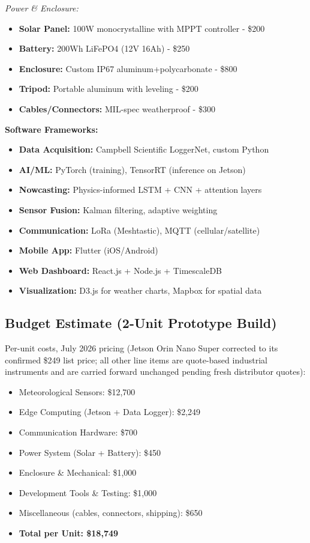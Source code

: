 \textit{Power \& Enclosure:}
\begin{itemize}
    \item \textbf{Solar Panel:} 100W monocrystalline with MPPT controller - \$200
    \item \textbf{Battery:} 200Wh LiFePO4 (12V 16Ah) - \$250
    \item \textbf{Enclosure:} Custom IP67 aluminum+polycarbonate - \$800
    \item \textbf{Tripod:} Portable aluminum with leveling - \$200
    \item \textbf{Cables/Connectors:} MIL-spec weatherproof - \$300
\end{itemize}

\textbf{Software Frameworks:}
\begin{itemize}
    \item \textbf{Data Acquisition:} Campbell Scientific LoggerNet, custom Python
    \item \textbf{AI/ML:} PyTorch (training), TensorRT (inference on Jetson)
    \item \textbf{Nowcasting:} Physics-informed LSTM + CNN + attention layers
    \item \textbf{Sensor Fusion:} Kalman filtering, adaptive weighting
    \item \textbf{Communication:} LoRa (Meshtastic), MQTT (cellular/satellite)
    \item \textbf{Mobile App:} Flutter (iOS/Android)
    \item \textbf{Web Dashboard:} React.js + Node.js + TimescaleDB
    \item \textbf{Visualization:} D3.js for weather charts, Mapbox for spatial data
\end{itemize}

\subsection{Budget Estimate (2-Unit Prototype Build)}

Per-unit costs, July 2026 pricing (Jetson Orin Nano Super corrected to its confirmed
\$249 list price; all other line items are quote-based industrial instruments and are
carried forward unchanged pending fresh distributor quotes):

\begin{itemize}
    \item Meteorological Sensors: \$12,700
    \item Edge Computing (Jetson + Data Logger): \$2,249
    \item Communication Hardware: \$700
    \item Power System (Solar + Battery): \$450
    \item Enclosure \& Mechanical: \$1,000
    \item Development Tools \& Testing: \$1,000
    \item Miscellaneous (cables, connectors, shipping): \$650
    \item \textbf{Total per Unit: \$18,749}
\end{itemize}


